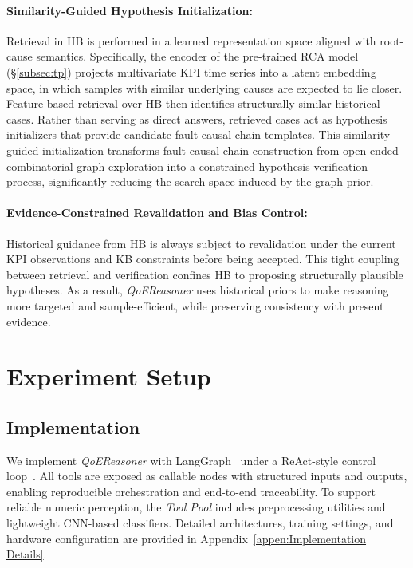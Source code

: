 \documentclass[sigconf,10pt]{acmart} %
\begin{document}
\paragraph{Similarity-Guided Hypothesis Initialization:}
Retrieval in HB is performed in a learned representation space aligned with root-cause semantics. Specifically, the encoder of the pre-trained RCA model (\S\ref{subsec:tp}) projects multivariate KPI time series into a latent embedding space, in which samples with similar underlying causes are expected to lie closer. Feature-based retrieval over HB then identifies structurally similar historical cases. Rather than serving as direct answers, retrieved cases act as hypothesis initializers that provide candidate fault causal chain templates. 
This similarity-guided initialization transforms fault causal chain construction from open-ended combinatorial graph exploration into a constrained hypothesis verification process, significantly reducing the search space induced by the graph prior.


\paragraph{Evidence-Constrained Revalidation and Bias Control:}
Historical guidance from HB is always subject to revalidation under the current KPI observations and KB constraints before being accepted. This tight coupling between retrieval and verification confines HB to proposing structurally plausible hypotheses. As a result, \textit{QoEReasoner} uses historical priors to make reasoning more targeted and sample-efficient, while preserving consistency with present evidence.



\section{Experiment Setup}


\subsection{Implementation}
We implement \textit{QoEReasoner} with LangGraph~\cite{langgraph2024} under a ReAct-style control loop~\cite{yao2022react}. All tools are exposed as callable nodes with structured inputs and outputs, enabling reproducible orchestration and end-to-end traceability. To support reliable numeric perception, the \emph{Tool Pool} includes preprocessing utilities and lightweight CNN-based classifiers. Detailed architectures, training settings, and hardware configuration are provided in Appendix~\ref{appen:Implementation Details}.
\end{document}
